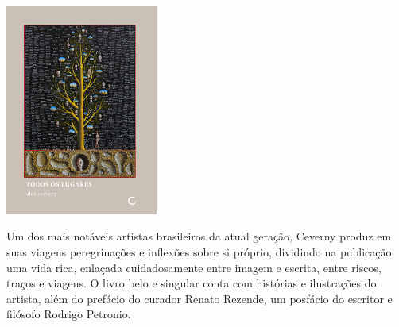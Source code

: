 \begin{center}
\hspace*{-4cm}
\hspace*{4cm}\includegraphics[width=50mm]{./imgs/lugares.jpg}
\end{center}

\hspace*{-7cm}\hrulefill\hspace*{-7cm}

\medskip

\noindent{}Um dos mais notáveis artistas brasileiros da atual geração, Ceverny produz em suas viagens peregrinações e inflexões sobre si próprio, dividindo na publicação uma vida rica, enlaçada cuidadosamente entre imagem e escrita, entre riscos, traços e viagens. O livro belo e singular conta com histórias e ilustrações do artista, além do prefácio do curador Renato Rezende, um posfácio do escritor e filósofo Rodrigo Petronio.


\vfill

\hspace*{-.4cm}\begin{minipage}[c]{1\linewidth}
\small{
{}}
\end{minipage}

\pagebreak

\hspace{.5cm}

